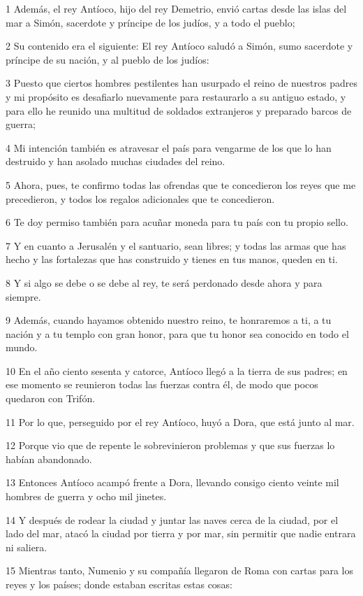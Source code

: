 \par 1 Además, el rey Antíoco, hijo del rey Demetrio, envió cartas desde las islas del mar a Simón, sacerdote y príncipe de los judíos, y a todo el pueblo;
\par 2 Su contenido era el siguiente: El rey Antíoco saludó a Simón, sumo sacerdote y príncipe de su nación, y al pueblo de los judíos:
\par 3 Puesto que ciertos hombres pestilentes han usurpado el reino de nuestros padres y mi propósito es desafiarlo nuevamente para restaurarlo a su antiguo estado, y para ello he reunido una multitud de soldados extranjeros y preparado barcos de guerra;
\par 4 Mi intención también es atravesar el país para vengarme de los que lo han destruido y han asolado muchas ciudades del reino.
\par 5 Ahora, pues, te confirmo todas las ofrendas que te concedieron los reyes que me precedieron, y todos los regalos adicionales que te concedieron.
\par 6 Te doy permiso también para acuñar moneda para tu país con tu propio sello.
\par 7 Y en cuanto a Jerusalén y el santuario, sean libres; y todas las armas que has hecho y las fortalezas que has construido y tienes en tus manos, queden en ti.
\par 8 Y si algo se debe o se debe al rey, te será perdonado desde ahora y para siempre.
\par 9 Además, cuando hayamos obtenido nuestro reino, te honraremos a ti, a tu nación y a tu templo con gran honor, para que tu honor sea conocido en todo el mundo.
\par 10 En el año ciento sesenta y catorce, Antíoco llegó a la tierra de sus padres; en ese momento se reunieron todas las fuerzas contra él, de modo que pocos quedaron con Trifón.
\par 11 Por lo que, perseguido por el rey Antíoco, huyó a Dora, que está junto al mar.
\par 12 Porque vio que de repente le sobrevinieron problemas y que sus fuerzas lo habían abandonado.
\par 13 Entonces Antíoco acampó frente a Dora, llevando consigo ciento veinte mil hombres de guerra y ocho mil jinetes.
\par 14 Y después de rodear la ciudad y juntar las naves cerca de la ciudad, por el lado del mar, atacó la ciudad por tierra y por mar, sin permitir que nadie entrara ni saliera.
\par 15 Mientras tanto, Numenio y su compañía llegaron de Roma con cartas para los reyes y los países; donde estaban escritas estas cosas:
